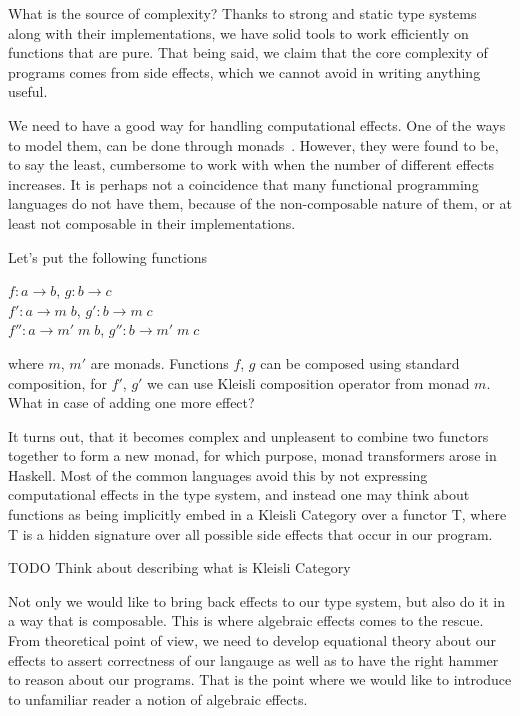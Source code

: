 \documentclass[declaration,shortabstract]{iithesis}
\theoremstyle{definition} \newtheorem{definition}{Definition}[chapter]
\theoremstyle{remark} \newtheorem{remark}[definition]{Observation}
\theoremstyle{plain} \newtheorem{theorem}[definition]{Theorem}
\theoremstyle{plain} \newtheorem{lemma}[definition]{Lemma}
\begin{document}
What is the source of complexity? Thanks to strong and static type systems along
with their implementations, we have solid tools to work efficiently on functions
that are pure. That being said, we claim that the core complexity of programs
comes from side effects, which we cannot avoid in writing anything useful.

We need to have a good way for handling computational effects. One of the ways
to model them, can be done through monads~\cite{moggi}. However, they were
found to be, to say the least, cumbersome to work with when the number of
different effects increases. It is perhaps not a coincidence that many
functional programming languages do not have them, because of the non-composable
nature of them, or at least not composable in their implementations.

Let's put the following functions

\begin{center}

    $ f: a \rightarrow b $, $ g : b \rightarrow c $ \\
    $ f': a \rightarrow m \; b $, $ g' : b \rightarrow m \; c $ \\
    $ f'': a \rightarrow m' \; m \; b $, $ g'' : b \rightarrow m' \; m \; c $ \\

\end{center}

where $m$, $m'$ are monads. Functions $f$, $g$ can be composed using standard
composition, for $f'$, $g'$ we can use Kleisli composition operator from monad $m$.
What in case of adding one more effect?

It turns out, that it becomes complex and unpleasent to combine two functors
together to form a new monad, for which purpose, monad transformers arose in Haskell.
Most of the common languages avoid this by not expressing computational effects
in the type system, and instead one may think about functions as being implicitly
embed in a Kleisli Category over a functor T, where T is a hidden signature over
all possible side effects that occur in our program.

TODO Think about describing what is Kleisli Category

Not only we would like to bring back effects to our type system, but also do it
in a way that is composable. This is where algebraic effects comes to the rescue.
From theoretical point of view, we need to develop equational theory about our
effects to assert correctness of our langauge as well as to have the right hammer
to reason about our programs. That is the point where we would like to introduce
to unfamiliar reader a notion of algebraic effects.
\end{document}
